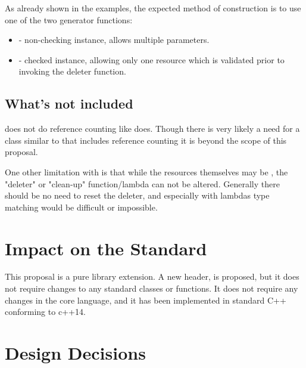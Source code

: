 \documentclass[ebook,11pt,article]{memoir}
\begin{document}
As already shown in the examples, the expected method of construction is to use one of the two generator functions:
\begin{itemize}
\item {} - non-checking instance, allows multiple parameters.
\item {} - checked instance, allowing only one resource which is validated prior to invoking the deleter function.
\end{itemize}

\section{What's not included}
 does not do reference counting like  does.  Though there is very likely a need for a class similar to  that includes reference counting it is beyond the scope of this proposal.

One other limitation with  is that while the resources themselves may be , the "deleter" or "clean-up" function/lambda can not be altered.  Generally there should be no need to reset the deleter, and especially with lambdas type matching would be difficult or impossible.

\chapter{Impact on the Standard}
This proposal is a pure library extension. A new header,  is proposed, but it does not require changes to any standard classes or functions. It does not require any changes in the core language, and it has been implemented in standard C++ conforming to c++14.

\chapter{Design Decisions}
\end{document}
